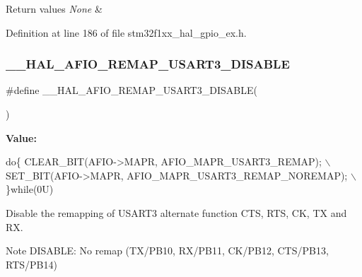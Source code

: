 \begin{DoxyRetVals}{Return values}
{\em None} & \\
\hline
\end{DoxyRetVals}


Definition at line 186 of file stm32f1xx\+\_\+hal\+\_\+gpio\+\_\+ex.\+h.

\mbox{\label{group___g_p_i_o_ex___a_f_i_o___a_f___r_e_m_a_p_p_i_n_g_ga4c86c7456cb7eda460d258245bb2e446}} 
\subsubsection{\texorpdfstring{\+\_\+\+\_\+\+H\+A\+L\+\_\+\+A\+F\+I\+O\+\_\+\+R\+E\+M\+A\+P\+\_\+\+U\+S\+A\+R\+T3\+\_\+\+D\+I\+S\+A\+B\+LE}{\_\_HAL\_AFIO\_REMAP\_USART3\_DISABLE}}
{\footnotesize\ttfamily \#define \+\_\+\+\_\+\+H\+A\+L\+\_\+\+A\+F\+I\+O\+\_\+\+R\+E\+M\+A\+P\+\_\+\+U\+S\+A\+R\+T3\+\_\+\+D\+I\+S\+A\+B\+LE(\begin{DoxyParamCaption}{ }\end{DoxyParamCaption})}

{\bfseries Value\+:}
\begin{DoxyCode}
\textcolor{keywordflow}{do}\{ CLEAR\_BIT(AFIO->MAPR, AFIO\_MAPR\_USART3\_REMAP);       \(\backslash\)
                                              SET\_BIT(AFIO->MAPR, AFIO\_MAPR\_USART3\_REMAP\_NOREMAP); \(\backslash\)
                                            \}\textcolor{keywordflow}{while}(0U)
\end{DoxyCode}


Disable the remapping of U\+S\+A\+R\+T3 alternate function C\+TS, R\+TS, CK, TX and RX. 

\begin{DoxyNote}{Note}
D\+I\+S\+A\+B\+LE\+: No remap (T\+X/\+P\+B10, R\+X/\+P\+B11, C\+K/\+P\+B12, C\+T\+S/\+P\+B13, R\+T\+S/\+P\+B14) 
\end{DoxyNote}


